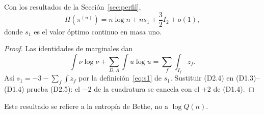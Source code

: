 \begin{teorema}\label{thm:entropia}
Con los resultados de la Sección~\ref{sec:perfil},
\[
 H(\pi^{(n)})=n\log n+n s_1+\frac32I_2+o(1),       \tag{D2.5}
\]
donde $s_1$ es el valor óptimo continuo en masa uno.
\end{teorema}
\begin{proof}
Las identidades de marginales dan
\[
 \int\nu\log\nu+\sum_{D,A}\int u\log u
        =\sum_f\int_{I_f}z_f.
\]
Así $s_1=-3-\sum_f\int z_f$ por la definición~\eqref{eq:s1} de $s_1$.
Sustituir (D2.4) en (D1.3)--(D1.4) prueba (D2.5):
el $-2$ de la cuadratura se cancela con el $+2$ de (D1.4).
\end{proof}
Este resultado se refiere a la entropía de Bethe, no a $\log Q(n)$.
